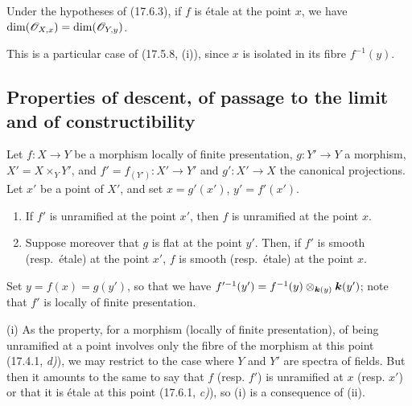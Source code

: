 \begin{proposition}[17.6.4]
\label{IV.17.6.4}
Under the hypotheses of \textup{(17.6.3)}, if $f$ is étale at the point $x$, we have $\dim(\mathscr{O}_{X,x})=\dim(\mathscr{O}_{Y,y})$.
\end{proposition}

This is a particular case of (17.5.8, (i)), since $x$ is isolated in its fibre $f^{-1}(y)$.


\subsection{Properties of descent, of passage to the limit and of constructibility}
\label{IV.17.7}

\begin{proposition}[17.7.1]
\label{IV.17.7.1}
Let $f:X\to Y$ be a morphism locally of finite presentation, $g:Y'\to Y$ a morphism, $X'=X\times_Y Y'$, and $f'=f_{(Y')}:X'\to Y'$ and $g':X'\to X$ the canonical projections. Let $x'$ be a point of $X'$, and set $x=g'(x')$, $y'=f'(x')$.
\begin{enumerate}
  \item[\textup{(i)}] If $f'$ is unramified at the point $x'$, then $f$ is unramified at the point $x$.
  \item[\textup{(ii)}] Suppose moreover that $g$ is flat at the point $y'$. Then, if $f'$ is smooth \textup{(resp.}\ étale\textup{)} at the point $x'$, $f$ is smooth \textup{(resp.}\ étale\textup{)} at the point $x$.
\end{enumerate}
\end{proposition}

Set $y=f(x)=g(y')$, so that we have $f'^{-1}(y')=f^{-1}(y)\otimes_{\boldsymbol{k}(y)}\boldsymbol{k}(y')$; note that $f'$ is locally of finite presentation.

(i) As the property, for a morphism (locally of finite presentation), of being unramified at a point involves only the fibre of the morphism at this point (17.4.1, \emph{d)}), we may restrict to the case where $Y$ and $Y'$ are spectra of fields. But then it amounts to the same to say that $f$ (resp. $f'$) is unramified at $x$ (resp. $x'$) or that it is étale at this point (17.6.1, \emph{c)}), so (i) is a consequence of (ii).

